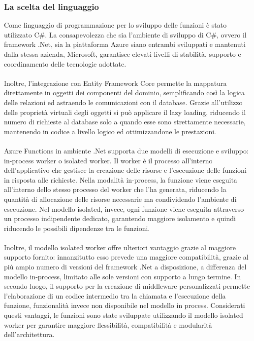 \subsubsection{La scelta del linguaggio}
Come linguaggio di programmazione per lo sviluppo delle funzioni è stato utilizzato C\#.
La consapevolezza che sia l’ambiente di sviluppo di C\#, ovvero il framework .Net, sia la piattaforma Azure siano entrambi sviluppati e mantenuti dalla stessa azienda, Microsoft,
garantisce elevati livelli di stabilità, supporto e coordinamento delle tecnologie adottate.\\
\\
Inoltre, l’integrazione con Entity Framework Core permette la mappatura direttamente in oggetti dei componenti del dominio, 
semplificando così la logica delle relazioni ed astraendo le comunicazioni con il database.
Grazie all’utilizzo delle proprietà virtuali degli oggetti si può applicare il lazy loading, 
riducendo il numero di richieste al database solo a quando esse sono strettamente necessarie, mantenendo in codice a livello logico ed ottimizzandone le prestazioni.\\
\\
Azure Functions in ambiente .Net supporta due modelli di esecuzione e sviluppo: in-process worker o isolated worker.
Il worker è il processo all’interno dell’applicativo che gestisce la creazione delle risorse e l’esecuzione delle funzioni in risposta alle richieste.
Nella modalità in-process, la funzione viene eseguita all’interno dello stesso processo del worker che l’ha generata,
riducendo la quantità di allocazione delle risorse necessarie ma condividendo l’ambiente di esecuzione.
Nel modello isolated, invece, ogni funzione viene eseguita attraverso un processo indipendente dedicato,
garantendo maggiore isolamento e quindi riducendo le possibili dipendenze tra le funzioni. \\
\\
Inoltre, il modello isolated worker offre ulteriori vantaggio grazie al maggiore supporto fornito:
innanzitutto esso prevede una maggiore compatibilità, grazie al più ampio numero di versioni del framework .Net a disposizione,
a differenza del modello in-process, limitato alle sole versioni con supporto a lungo termine.
In secondo luogo, il supporto per la creazione di middleware personalizzati 
permette l’elaborazione di un codice intermedio tra la chiamata e l’esecuzione della funzione,
funzionalità invece non disponibile nel modello in process.
Considerati questi vantaggi, le funzioni sono state sviluppate utilizzando il modello isolated worker 
per garantire maggiore flessibilità, compatibilità e modularità dell’architettura.
\clearpage


